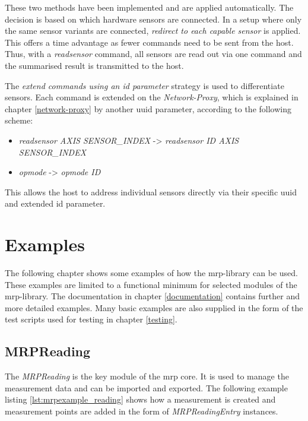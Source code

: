 These two methods have been implemented and are applied automatically.
The decision is based on which hardware sensors are connected. In a
setup where only the same sensor variants are connected, \emph{redirect
to each capable sensor} is applied. This offers a time advantage as
fewer commands need to be sent from the host. Thus, with a
\emph{readsensor} command, all sensors are read out via one command and
the summarised result is transmitted to the host.

The \emph{extend commands using an id parameter} strategy is used to
differentiate sensors. Each command is extended on the
\emph{Network-Proxy}, which is explained in chapter \ref{network-proxy}
by another \gls{uuid} parameter, according to the following scheme:

\begin{itemize}
\tightlist
\item
  \emph{readsensor AXIS SENSOR\_INDEX} -\textgreater{} \emph{readsensor
  ID AXIS SENSOR\_INDEX}
\item
  \emph{opmode} -\textgreater{} \emph{opmode ID}
\end{itemize}

This allows the host to address individual sensors directly via their
specific \gls{uuid} and extended id parameter.

\hypertarget{examples}{%
\section{Examples}\label{examples}}

The following chapter shows some examples of how the \gls{mrp}-library
can be used. These examples are limited to a functional minimum for
selected modules of the \gls{mrp}-library. The documentation in chapter
\ref{documentation} contains further and more detailed examples. Many
basic examples are also supplied in the form of the test scripts used
for testing in chapter \ref{testing}.

\hypertarget{mrpreading}{%
\subsection{MRPReading}\label{mrpreading}}

The \emph{MRPReading} is the key module of the \gls{mrp} core. It is
used to manage the measurement data and can be imported and exported.
The following example listing \ref{lst:mrpexample_reading} shows how a
measurement is created and measurement points are added in the form of
\emph{MRPReadingEntry} instances.

